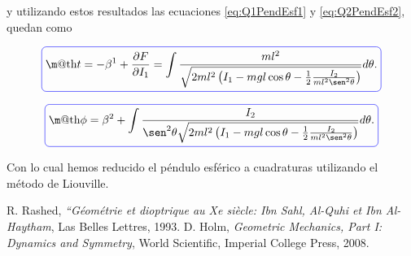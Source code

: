 \documentclass[a4paper,10pt]{article}
\makeatletter
\numberwithin{equation}{section}
\newcommand*{\boxcolor}{blue}
\renewcommand{\boxed}[1]{\textcolor{\boxcolor}{%
\tikz[baseline={([yshift=-1ex]current bounding box.center)}] \node [rectangle, minimum width=1ex,rounded corners,draw] {\normalcolor\m@th$\displaystyle#1$};}}
\makeatother
\begin{document}
y utilizando estos resultados las ecuaciones \eqref{eq:Q1PendEsf1} y \eqref{eq:Q2PendEsf2}, 
quedan como 

\begin{equation}
 \boxed{t = -\beta^1 + \frac{\partial F}{\partial I_1} = \int \frac{ml^2}{\sqrt{2ml^2\left(I_1 -
 mgl\cos{\theta} - \frac{1}{2}\frac{I_2}{ml^2\sen^2{\theta}} \right)}}d\theta.}
\end{equation}

\begin{equation}
 \boxed{\phi = \beta^2 + \int \frac{I_2}{\sen^2{\theta}\sqrt{2ml^2\left(I_1 - mgl\cos{\theta} - 
 \frac{1}{2}\frac{I_2}{ml^2\sen^2{\theta}} \right)}}d\theta.}
\end{equation}

Con lo cual hemos reducido el péndulo esférico a cuadraturas utilizando el método 
de Liouville.

\begin{thebibliography}{10}
R. Rashed, \emph{“Géométrie et dioptrique au Xe siècle: Ibn Sahl, 
Al-Quhi et Ibn Al-Haytham}, Las Belles Lettres, 1993.
D. Holm, \emph{Geometric Mechanics, Part I: Dynamics and Symmetry}, World Scientific, 
Imperial College Press, 2008.
\end{thebibliography}
\end{document}

